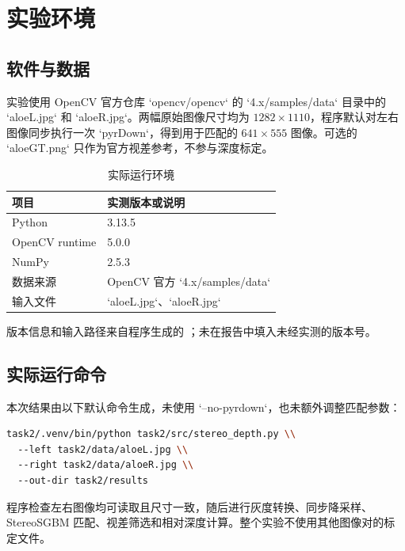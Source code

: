 \section{实验环境}

\subsection{软件与数据}

实验使用 OpenCV 官方仓库 `opencv/opencv` 的
`4.x/samples/data` 目录中的 `aloeL.jpg` 和 `aloeR.jpg`。两幅原始图像尺寸均为
$1282\times1110$，程序默认对左右图像同步执行一次 `pyrDown`，得到用于匹配的
$641\times555$ 图像。可选的 `aloeGT.png` 只作为官方视差参考，不参与深度标定。

\begin{table}[H]
  \centering
  \caption{实际运行环境}
  \label{tab:environment}
  \begin{tabular}{ll}
    \toprule
    项目 & 实测版本或说明 \\
    \midrule
    Python & 3.13.5 \\
    OpenCV runtime & 5.0.0 \\
    NumPy & 2.5.3 \\
    数据来源 & OpenCV 官方 `4.x/samples/data` \\
    输入文件 & `aloeL.jpg`、`aloeR.jpg` \\
    \bottomrule
  \end{tabular}
\end{table}

版本信息和输入路径来自程序生成的
；未在报告中填入未经实测的版本号。

\subsection{实际运行命令}

本次结果由以下默认命令生成，未使用 `--no-pyrdown`，也未额外调整匹配参数：

\begin{lstlisting}[language=bash]
task2/.venv/bin/python task2/src/stereo_depth.py \\
  --left task2/data/aloeL.jpg \\
  --right task2/data/aloeR.jpg \\
  --out-dir task2/results
\end{lstlisting}

程序检查左右图像均可读取且尺寸一致，随后进行灰度转换、同步降采样、StereoSGBM
匹配、视差筛选和相对深度计算。整个实验不使用其他图像对的标定文件。
